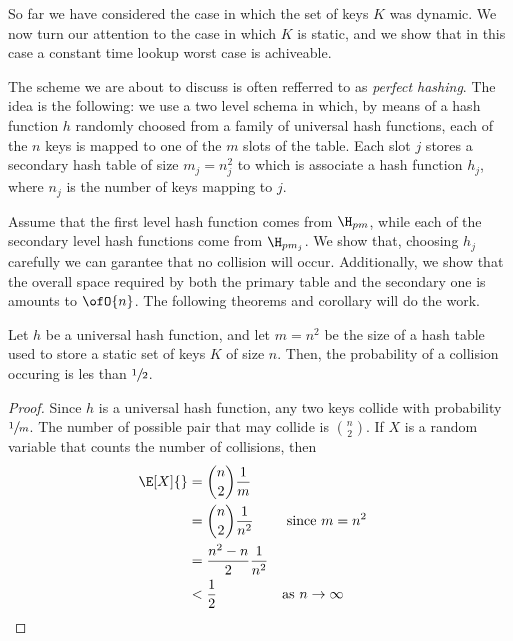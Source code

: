 \documentclass{subfiles}
\begin{document}
    So far we have considered the case in which the set of keys \(K\) was dynamic.
        We now turn our attention to the case in which \(K\) is static,
        and we show that in this case a constant time lookup worst case is achiveable.

    The scheme we are about to discuss is often refferred to as \emph{perfect hashing}.
        The idea is the following: we use a two level schema in which,
        by means of a hash function \(h\) randomly choosed from a family of universal hash functions,
        each of the \(n\) keys is mapped to one of the \(m\) slots of the table.
        Each slot \(j\) stores a secondary hash table of size \(m_{j} = n_{j}^{2}\) 
        to which is associate a hash function \(h_{j}\), 
        where \(n_{j}\) is the number of keys mapping to \(j\).
    
    Assume that the first level hash function comes from \(\H_{pm}\), 
        while each of the secondary level hash functions come from \(\H_{pm_{j}}\).
        We show that, choosing \(h_{j}\) carefully we can garantee that no collision will occur.
        Additionally, we show that the overall space required by both the primary table 
        and the secondary one is amounts to \(\ofO{n}\).
        The following theorems and corollary will do the work.

    \begin{theorem*}
        Let \(h\) be a universal hash function, and let \(m = n^{2}\) be the size of a hash table 
            used to store a static set of keys \(K\) of size \(n\). Then,
            the probability of a collision occuring is les than \(\sfrac{1}{2}\).
    \end{theorem*}
    \begin{proof}
        Since \(h\) is a universal hash function, any two keys collide with probability \(\sfrac{1}{m}\).
            The number of possible pair that may collide is \(\binom{n}{2}\).
            If \(X\) is a random variable that counts the number of collisions, 
            then 
            \[\begin{aligned}
                \E[X]{} & = \binom{n}{2} \frac{1}{m} \\
                        & = \binom{n}{2} \frac{1}{n^{2}} && \text{ since \(m = n^{2} \)}\\ 
                        & = \frac{n^{2} - n}{2} \frac{1}{n^{2}} \\ 
                        & < \frac{1}{2} && \text{as \(n \to \infty\)}
            \end{aligned}\]
    \end{proof}
\end{document}
